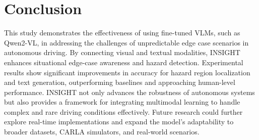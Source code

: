 \section{Conclusion}
This study demonstrates the effectiveness of using fine-tuned VLMs, such as Qwen2-VL, in addressing the challenges of unpredictable edge case scenarios in autonomous driving. By connecting visual and textual modalities, INSIGHT enhances situational edge-case awareness and hazard detection. Experimental results show significant improvements in accuracy for hazard region localization and text generation, outperforming baselines and approaching human-level performance. INSIGHT not only advances the robustness of autonomous systems but also provides a framework for integrating multimodal learning to handle complex and rare driving conditions effectively. 
Future research could further explore real-time implementations and expand the model's adaptability to broader datasets, CARLA simulators, and real-world scenarios.